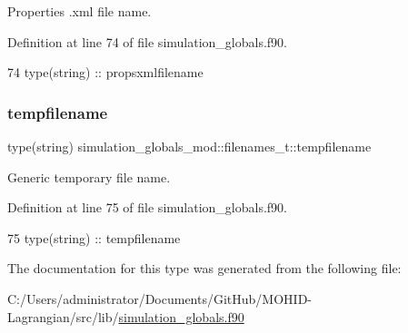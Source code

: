 Properties .xml file name. 



Definition at line 74 of file simulation\+\_\+globals.\+f90.


\begin{DoxyCode}
74         \textcolor{keywordtype}{type}(string) :: propsxmlfilename
\end{DoxyCode}
\mbox{\label{structsimulation__globals__mod_1_1filenames__t_a207bede622cac14f7baef87cf0c000b7}} 
\subsubsection{\texorpdfstring{tempfilename}{tempfilename}}
{\footnotesize\ttfamily type(string) simulation\+\_\+globals\+\_\+mod\+::filenames\+\_\+t\+::tempfilename\hspace{0.3cm}{\ttfamily [private]}}



Generic temporary file name. 



Definition at line 75 of file simulation\+\_\+globals.\+f90.


\begin{DoxyCode}
75         \textcolor{keywordtype}{type}(string) :: tempfilename
\end{DoxyCode}


The documentation for this type was generated from the following file\+:\begin{DoxyCompactItemize}
\item 
C\+:/\+Users/administrator/\+Documents/\+Git\+Hub/\+M\+O\+H\+I\+D-\/\+Lagrangian/src/lib/\mbox{\hyperlink{simulation__globals_8f90}{simulation\+\_\+globals.\+f90}}\end{DoxyCompactItemize}
